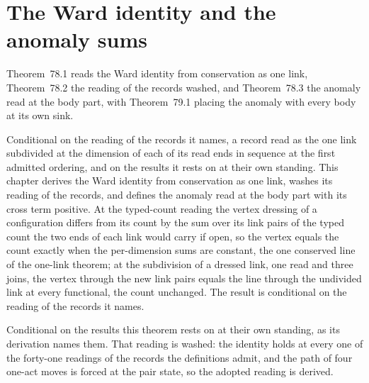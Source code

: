 \section{The Ward identity and the anomaly sums}\label{mod:IV-8-ward-identity-and-the-anomaly-sums}
\label{narr:open:4-8}Theorem~78.1 reads the Ward identity from conservation as one link, Theorem~78.2 the reading of the records washed, and Theorem~78.3 the anomaly read at the body part, with Theorem~79.1 placing the anomaly with every body at its own sink.
\begin{chconditional}\label{box:IV-8-ward-identity-and-the-anomaly-sums:1}
Conditional on the reading of the records it names, a record read as the one link subdivided at the dimension of each of its read ends in sequence at the first admitted ordering, and on the results it rests on at their own standing.
This chapter derives the Ward identity from conservation as one link, washes its reading of the records, and defines the anomaly read at the body part with its cross term positive. At the typed-count reading the vertex dressing of a configuration differs from its count by the sum over its link pairs of the typed count the two ends of each link would carry if open, so the vertex equals the count exactly when the per-dimension sums are constant, the one conserved line of the one-link theorem; at the subdivision of a dressed link, one read and three joins, the vertex through the new link pairs equals the line through the undivided link at every functional, the count unchanged. The result is conditional on the reading of the records it names.
\end{chconditional}
\begin{chconditional}\label{box:IV-8-ward-identity-and-the-anomaly-sums:2}
Conditional on the results this theorem rests on at their own standing, as its derivation names them.
That reading is washed: the identity holds at every one of the forty-one readings of the records the definitions admit, and the path of four one-act moves is forced at the pair state, so the adopted reading is derived.
\end{chconditional}
